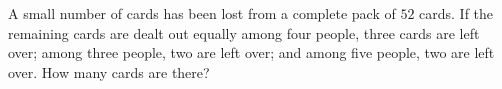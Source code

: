 A small number of cards has been lost from a complete pack of $52$ cards. If the remaining cards are dealt out equally among four people, three cards are left over; among three people, two are left over; and among five people, two are left over. How many cards are there?
